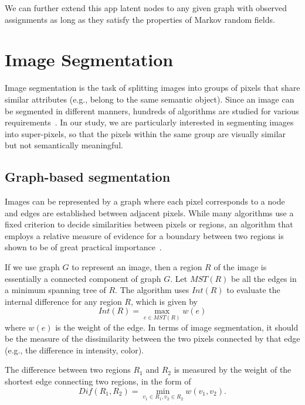 We can further extend this app latent nodes to any given graph with observed assignments as long as they satisfy the properties of Markov random fields.


\section{Image Segmentation}
\label{sec:Image Segmentation}

Image segmentation is the task of splitting images into groups of pixels that share similar attributes (e.g., belong to the same semantic object). Since an image can be segmented in different manners, hundreds of algorithms are studied for various requirements~\cite{szeliski2010computer}. In our study, we are particularly interested in segmenting images into super-pixels, so that the pixels within the same group are visually similar but not semantically meaningful.

\subsection{Graph-based segmentation}
\label{sec:Graph-based segmentation}

Images can be represented by a graph where each pixel corresponds to a node and edges are established between adjacent pixels. While many algorithms use a fixed criterion to decide similarities between pixels or regions, an algorithm that employs a relative measure of evidence for a boundary between two regions is shown to be of great practical importance~\cite{felzenszwalb2004efficient}.

If we use graph $G$ to represent an image, then a region $R$ of the image is essentially a connected component of graph $G$. Let $MST(R)$ be all the edges in a minimum spanning tree of $R$. The algorithm uses $Int(R)$ to evaluate the internal difference for any region $R$, which is given by
\begin{equation}
	Int(R) = \max\limits_{e\in MST(R)}w(e)
\end{equation}
where $w(e)$ is the weight of the edge. In terms of image segmentation, it should be the measure of the dissimilarity between the two pixels connected by that edge (e.g., the difference in intensity,
color).

The difference between two regions $R_1$ and $R_2$ is measured by the weight of the shortest edge connecting two regions, in the form of
\begin{equation}
	Dif(R_1,R_2) = \min\limits_{v_1\in R_1, v_2\in R_2}w(v_1,v_2).
\end{equation}

